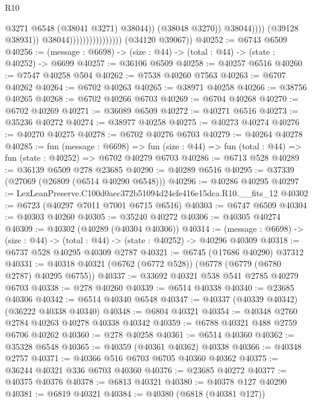 \begin{lexlean}{R10}
\begin{coremodule}
                                                      @3271
                                                      @6548
                                                      (@38041 @3271)
                                                      @38044))
                                                  (@38048 @3270))
                                                @38044))))
                                        (@39128 @38931))
                                      @38044))))))))))))))))
      (@34120 @39067))
@40252 := @6743 @6509
@40256 := (message : @6698) -> (size : @44) -> (total : @44) -> (state : @40252) -> @6699
@40257 := @36106 @6509
@40258 := @40257 @6516
@40260 := @7547 @40258 @504
@40262 := @7538 @40260 @7563
@40263 := @6707 @40262
@40264 := @6702 @40263
@40265 := @38971 @40258
@40266 := @38756 @40265
@40268 := @6702 @40266 @6703
@40269 := @6704 @40268
@40270 := @6702 @40269
@40271 := @36089 @6509
@40272 := @40271 @6516
@40273 := @35236 @40272
@40274 := @38977 @40258
@40275 := @40273 @40274
@40276 := @40270 @40275
@40278 := @6702 @40276 @6703
@40279 := @40264 @40278
@40285 := fun (message : @6698) =>
  fun (size : @44) => fun (total : @44) => fun (state : @40252) => @6702 @40279 @6703
@40286 := @6713 @528
@40289 := @36139 @6509 @278 @23685
@40290 := @40289 @6516
@40295 := @37339 (@27069 (@26809 (@6514 @40290 @6548)))
@40296 := @40286 @40295
@40297 := LexLeanPreserve.C100d0aec372b51094d24efe416e15dca.R10.__fits_12
@40302 := @6723 (@40297 @7011 @7001 @6715 @6516)
@40303 := @6747 @6509
@40304 := @40303 @40260
@40305 := @35240 @40272
@40306 := @40305 @40274
@40309 := @40302 (@40289 (@40304 @40306))
@40314 := (message : @6698) -> (size : @44) -> (total : @44) -> (state : @40252) -> @40296 @40309
@40318 := @6737 @528 @40295 @40309 @2787
@40321 := @6745 (@17686 @40290) @37312
@40331 := @40318 @40321 (@6762 (@6772 @528)) (@6778 (@6779 (@6780 @2787) @40295 @6755))
@40337 := @33692 @40321 @538 @541 @2785 @40279 @6703
@40338 := @278 @40260
@40339 := @6514 @40338
@40340 := @23685 @40306
@40342 := @6514 @40340 @6548
@40347 := @40337 (@40339 @40342) (@36222 @40338 @40340)
@40348 := @6804 @40321
@40354 := @40348 @2760 @2784 @40263 @40278 @40338 @40342
@40359 := @6788 @40321 @488 @2759 @6706 @40262
@40360 := @278 @40258
@40361 := @6514 @40360
@40362 := @35328 @6548
@40365 := @40359 (@40361 @40362) @40338
@40366 := @40348 @2757
@40371 := @40366 @516 @6703 @6705 @40360 @40362
@40375 := @36244 @40321 @336 @6703 @40360
@40376 := @23685 @40272
@40377 := @40375 @40376
@40378 := @6813 @40321
@40380 := @40378 @127 @40290
@40381 := @6819 @40321
@40384 := @40380 (@6818 (@40381 @127))

\end{coremodule}
\end{lexlean}
